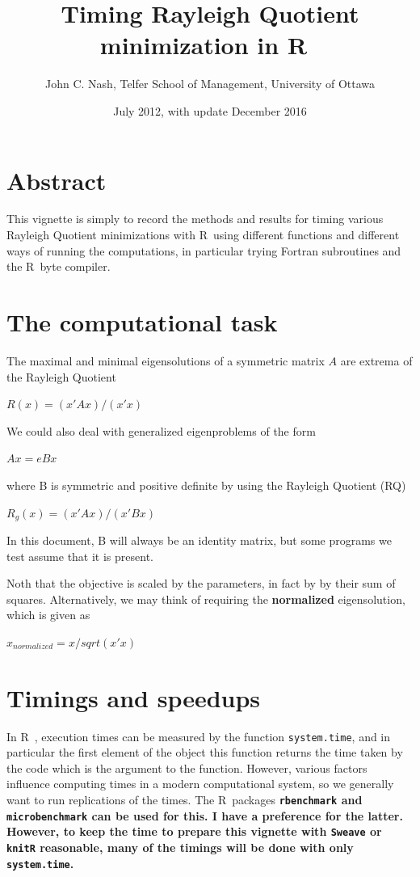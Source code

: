 \documentclass[10pt]{article}\usepackage[]{graphicx}\usepackage[]{color}
\newcommand{\R}{{\sf R\ }}
\newcommand{\B}[1]{{\bf #1 \rm}}
\newcommand{\code}[1]{{\tt #1}}
\newcommand{\pkg}[1]{\bf{\tt #1}\rm }
\begin{document}
\title{Timing Rayleigh Quotient minimization in \R}
\author{John C. Nash, Telfer School of Management, University of Ottawa}
\date{July 2012, with update December 2016}
\maketitle

\section*{Abstract}

This vignette is simply to record the methods and results for timing 
various Rayleigh Quotient minimizations with \R using different functions
and different ways of running the computations, in particular trying Fortran
subroutines and the \R byte compiler.

\section{The computational task}

The maximal and minimal eigensolutions of a symmetric matrix $A$ are extrema of the Rayleigh Quotient

$ R(x) =  (x' A x)  / (x' x) $

We could also deal with generalized eigenproblems of the form 

$A x = e B x$

where B is symmetric and positive definite by using the Rayleigh Quotient (RQ)

$ R_g(x) =  (x' A x)  / (x' B x) $

In this document, B will always be an identity matrix, but some programs we test
assume that it is present.

Noth that the objective is scaled by the parameters, in fact by by their 
sum of squares. Alternatively, 
we may think of requiring the \B{normalized} eigensolution, which is given as 

$ x_{normalized} = x/sqrt(x' x) $

\section{Timings and speedups}

In \R, execution times can be measured by the function \code{system.time},
and in particular the first element of the object this function returns the time
taken by the code which is the argument to the function. 
However, various factors influence computing times in a modern computational
system, so we generally want to run replications of the times. The \R packages
\pkg{rbenchmark} and \pkg{microbenchmark} can be used for this. I have a 
preference for the latter. However, to keep the time to prepare this vignette
with \pkg{Sweave} or \pkg{knitR} reasonable, many of the timings will be
done with only \code{system.time}.
\end{document}
